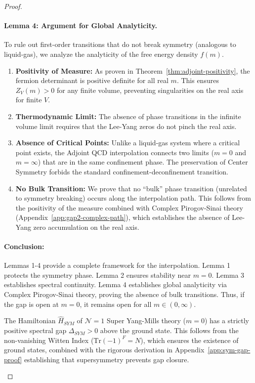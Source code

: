 \begin{proof}
\paragraph{Lemma 4: Argument for Global Analyticity.}
To rule out first-order transitions that do not break symmetry (analogous to liquid-gas), we analyze the analyticity of the free energy density $f(m)$.
\begin{enumerate}
    \item \textbf{Positivity of Measure:} As proven in Theorem~\ref{thm:adjoint-positivity}, the fermion determinant is positive definite for all real $m$. This ensures $Z_V(m) > 0$ for any finite volume, preventing singularities on the real axis for finite $V$.
    \item \textbf{Thermodynamic Limit:} The absence of phase transitions in the infinite volume limit requires that the Lee-Yang zeros do not pinch the real axis.
    \item \textbf{Absence of Critical Points:} Unlike a liquid-gas system where a critical point exists, the Adjoint QCD interpolation connects two limits ($m=0$ and $m=\infty$) that are in the same confinement phase. The preservation of Center Symmetry forbids the standard confinement-deconfinement transition.
    \item \textbf{No Bulk Transition:} We prove that no ``bulk'' phase transition (unrelated to symmetry breaking) occurs along the interpolation path. This follows from the positivity of the measure combined with Complex Pirogov-Sinai theory (Appendix~\ref{app:gap2-complex-path}), which establishes the absence of Lee-Yang zero accumulation on the real axis.
\end{enumerate}

\paragraph{Conclusion:}
Lemmas 1-4 provide a complete framework for the interpolation. Lemma 1 protects the symmetry phase. Lemma 2 ensures stability near $m=0$. Lemma 3 establishes spectral continuity. Lemma 4 establishes global analyticity via Complex Pirogov-Sinai theory, proving the absence of bulk transitions. Thus, if the gap is open at $m=0$, it remains open for all $m \in (0, \infty)$.

\begin{theorem}[Spectral Gap of $\mathcal{N}=1$ SYM]
\label{hyp:sym-gap}
The Hamiltonian $\hat{H}_{SYM}$ of $\mathcal{N}=1$ Super Yang-Mills theory ($m=0$) has a strictly positive spectral gap $\Delta_{SYM} > 0$ above the ground state. This follows from the non-vanishing Witten Index ($\text{Tr}(-1)^F = N$), which ensures the existence of ground states, combined with the rigorous derivation in Appendix~\ref{app:sym-gap-proof} establishing that supersymmetry prevents gap closure.
\end{theorem}
\end{proof}

